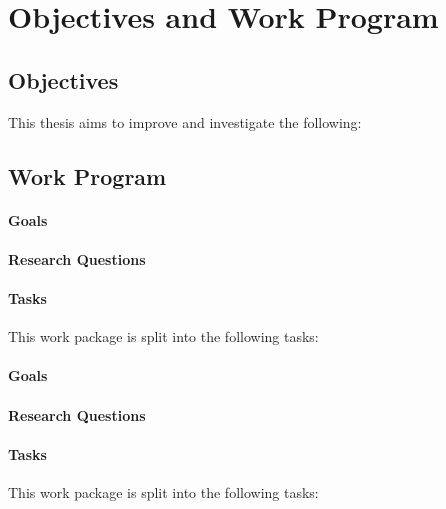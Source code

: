 
\chapter{Objectives and Work Program}

\section{Objectives}
\label{sec-objectives}

\blindtext

This thesis aims to improve and investigate the following:

\blinditemize


\section{Work Program}
\label{sec-workprogram}

\blindtext

\label{wp:something}

\subsubsection{Goals}
\blindtext

\subsubsection{Research Questions}
\blinditemize

\subsubsection{Tasks}
This work package is split into the following tasks:
\blinditemize


\label{wp:something}

\subsubsection{Goals}
\blindtext

\subsubsection{Research Questions}
\blinditemize

\subsubsection{Tasks}
This work package is split into the following tasks:
\blinditemize


